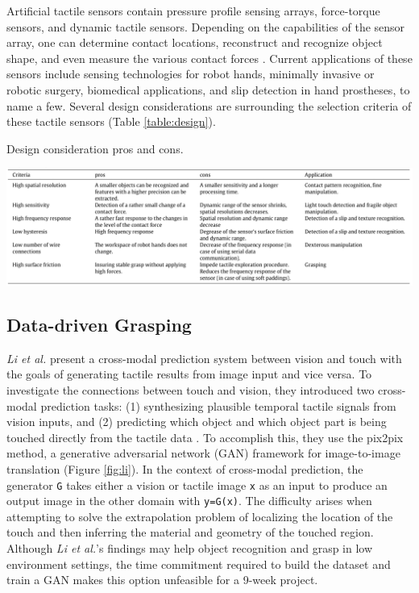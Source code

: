 \documentclass[11.5pt]{article}
\begin{document}
Artificial tactile sensors contain pressure profile sensing arrays, force-torque sensors, and dynamic tactile sensors. Depending on the capabilities of the sensor array, one can determine contact locations, reconstruct and recognize object shape, and even measure the various contact forces \cite{Stillfried2014-to}. Current applications of these sensors include sensing technologies for robot hands, minimally invasive or robotic surgery, biomedical applications, and slip detection in hand prostheses, to name a few. Several design considerations are surrounding the selection criteria of these tactile sensors (Table \ref{table:design}).

\begin{table}[H]
    \centering
    \caption{Design consideration pros and cons.}
    \includegraphics[width=1.0\linewidth]{assets/designprocon.png}
    \label{table:design}
\end{table}

\subsection{Data-driven Grasping}

\textit{Li et al.} present a cross-modal prediction system between vision and touch with the goals of generating tactile results from image input and vice versa. To investigate the connections between touch and vision, they introduced two cross-modal prediction tasks: (1) synthesizing plausible temporal tactile signals from vision inputs, and (2) predicting which object and which object part is being touched directly from the tactile data \cite{Li2019-eu}. To accomplish this, they use the pix2pix method, a generative adversarial network (GAN) framework for image-to-image translation (Figure \ref{fig:li}). In the context of cross-modal prediction, the generator \texttt{G} takes either a vision or tactile image \texttt{x} as an input to produce an output image in the other domain with \texttt{y=G(x)}. The difficulty arises when attempting to solve the extrapolation problem of localizing the location of the touch and then inferring the material and geometry of the touched region. Although \textit{Li et al.}'s findings may help object recognition and grasp in low environment settings, the time commitment required to build the dataset and train a GAN makes this option unfeasible for a 9-week project.
\end{document}
